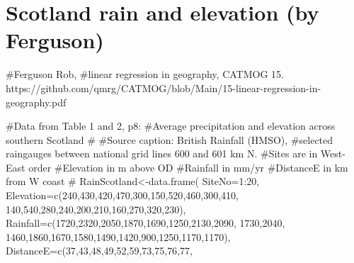 \documentclass[
  letterpaper,
  DIV=11,
  numbers=noendperiod]{scrreprt}
\newenvironment{Shaded}{\begin{snugshade}}{\end{snugshade}}
\newcommand{\AttributeTok}[1]{\textcolor[rgb]{0.40,0.45,0.13}{#1}}
\newcommand{\CommentTok}[1]{\textcolor[rgb]{0.37,0.37,0.37}{#1}}
\newcommand{\DecValTok}[1]{\textcolor[rgb]{0.68,0.00,0.00}{#1}}
\newcommand{\FunctionTok}[1]{\textcolor[rgb]{0.28,0.35,0.67}{#1}}
\newcommand{\NormalTok}[1]{\textcolor[rgb]{0.00,0.23,0.31}{#1}}
\newcommand{\OtherTok}[1]{\textcolor[rgb]{0.00,0.23,0.31}{#1}}
\newcommand{\SpecialCharTok}[1]{\textcolor[rgb]{0.37,0.37,0.37}{#1}}
\begin{document}
\section{Scotland rain and elevation (by
Ferguson)}\label{scotland-rain-and-elevation-by-ferguson}

\begin{Shaded}
\begin{Highlighting}[]
\CommentTok{\#Ferguson Rob,}
\CommentTok{\#linear regression in geography, CATMOG 15. https://github.com/qmrg/CATMOG/blob/Main/15{-}linear{-}regression{-}in{-}geography.pdf}

\CommentTok{\#Data from Table 1 and 2, p8:}
\CommentTok{\#Average precipitation and elevation across southern Scotland}
\CommentTok{\#}
\CommentTok{\#Source caption: British Rainfall (HMSO),}
\CommentTok{\#selected raingauges between national grid lines 600 and 601 km N.}
\CommentTok{\#Sites are in West{-}East order}
\CommentTok{\#Elevation in m above OD}
\CommentTok{\#Rainfall in mm/yr}
\CommentTok{\#DistanceE in km from W coast}
\CommentTok{\#}
\NormalTok{RainScotland}\OtherTok{\textless{}{-}}\FunctionTok{data.frame}\NormalTok{(}
  \AttributeTok{SiteNo=}\DecValTok{1}\SpecialCharTok{:}\DecValTok{20}\NormalTok{,}
  \AttributeTok{Elevation=}\FunctionTok{c}\NormalTok{(}\DecValTok{240}\NormalTok{,}\DecValTok{430}\NormalTok{,}\DecValTok{420}\NormalTok{,}\DecValTok{470}\NormalTok{,}\DecValTok{300}\NormalTok{,}\DecValTok{150}\NormalTok{,}\DecValTok{520}\NormalTok{,}\DecValTok{460}\NormalTok{,}\DecValTok{300}\NormalTok{,}\DecValTok{410}\NormalTok{,}
              \DecValTok{140}\NormalTok{,}\DecValTok{540}\NormalTok{,}\DecValTok{280}\NormalTok{,}\DecValTok{240}\NormalTok{,}\DecValTok{200}\NormalTok{,}\DecValTok{210}\NormalTok{,}\DecValTok{160}\NormalTok{,}\DecValTok{270}\NormalTok{,}\DecValTok{320}\NormalTok{,}\DecValTok{230}\NormalTok{),}
  \AttributeTok{Rainfall=}\FunctionTok{c}\NormalTok{(}\DecValTok{1720}\NormalTok{,}\DecValTok{2320}\NormalTok{,}\DecValTok{2050}\NormalTok{,}\DecValTok{1870}\NormalTok{,}\DecValTok{1690}\NormalTok{,}\DecValTok{1250}\NormalTok{,}\DecValTok{2130}\NormalTok{,}\DecValTok{2090}\NormalTok{, }\DecValTok{1730}\NormalTok{,}\DecValTok{2040}\NormalTok{,}
             \DecValTok{1460}\NormalTok{,}\DecValTok{1860}\NormalTok{,}\DecValTok{1670}\NormalTok{,}\DecValTok{1580}\NormalTok{,}\DecValTok{1490}\NormalTok{,}\DecValTok{1420}\NormalTok{,}\DecValTok{900}\NormalTok{,}\DecValTok{1250}\NormalTok{,}\DecValTok{1170}\NormalTok{,}\DecValTok{1170}\NormalTok{),}
  \AttributeTok{DistanceE=}\FunctionTok{c}\NormalTok{(}\DecValTok{37}\NormalTok{,}\DecValTok{43}\NormalTok{,}\DecValTok{48}\NormalTok{,}\DecValTok{49}\NormalTok{,}\DecValTok{52}\NormalTok{,}\DecValTok{59}\NormalTok{,}\DecValTok{73}\NormalTok{,}\DecValTok{75}\NormalTok{,}\DecValTok{76}\NormalTok{,}\DecValTok{77}\NormalTok{,}

\end{Highlighting}
\end{Shaded}
\end{document}
